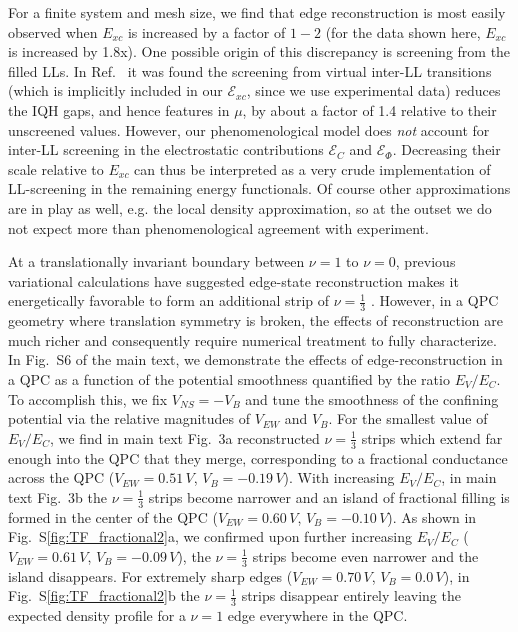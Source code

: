 \documentclass[reprint,prl,aps,superscriptaddress]{revtex4-1}
\begin{document}
For a finite system and mesh size, we find that edge reconstruction is most easily observed when $E_{xc}$  is increased by a factor of $1 - 2$  (for the data shown here, $E_{xc}$ is increased by 1.8x).  One possible origin of this discrepancy is screening from the filled LLs. 
In Ref.~\cite{yang_experimental_2021} it was found the screening from virtual inter-LL  transitions (which is implicitly included in our $\mathcal{E}_{xc}$, since we use experimental data) reduces the IQH gaps, and hence features in $\mu$, by about a factor of 1.4 relative to their unscreened values.  However, our phenomenological model does \emph{not} account for inter-LL screening in the electrostatic contributions $\mathcal{E}_C$ and $\mathcal{E}_\Phi$. 
Decreasing their scale relative to $E_{xc}$ can thus be interpreted as a very crude implementation of LL-screening in the remaining energy functionals. Of course other approximations are in play as well,  e.g. the local density approximation, so at the outset we do not expect more than phenomenological agreement with experiment. 

At a translationally invariant boundary between $\nu=1$ to $\nu=0$, previous variational calculations have suggested edge-state reconstruction makes it energetically favorable to form an additional strip of $\nu=\tfrac13$ \cite{khanna_fractional_2021}.  However, in a QPC geometry where translation symmetry is broken, the effects of reconstruction are much richer and consequently require numerical treatment to fully characterize.  In Fig.~S6 of the main text, we demonstrate the effects of edge-reconstruction in a QPC as a function of the potential smoothness quantified by the ratio $E_V / E_C$.  To accomplish this, we fix $V_{NS} = -V_B$ and tune the smoothness of the confining potential via the relative magnitudes of $V_{EW}$ and $V_B$. 
For the smallest value of $E_V / E_C$, we find in main text Fig.~3a reconstructed $\nu=\frac13$ strips which extend far enough into the QPC that they merge, corresponding to a fractional conductance across the QPC ($V_{EW}=0.51\,\si{V}$, $V_B=-0.19\,\si{V}$). With increasing $E_V / E_C$, in main text Fig.~3b the $\nu=\tfrac13$ strips become narrower and an island of fractional filling is formed in the center of the QPC ($V_{EW}=0.60\,\si{V}$, $V_B=-0.10\,\si{V}$).  As shown in Fig.~S\ref{fig:TF_fractional2}a, we confirmed upon further increasing $E_V / E_C$ ($V_{EW} = 0.61\,\si{V}$, $V_B=-0.09\,\si{V}$), the $\nu=\tfrac13$ strips become even narrower and the island disappears. For extremely sharp edges ($V_{EW}=0.70\,\si{V}$, $V_B=0.0\,\si{V}$), in Fig.~S\ref{fig:TF_fractional2}b the $\nu=\tfrac13$ strips disappear entirely leaving the expected density profile for a $\nu = 1$ edge everywhere in the QPC.
\end{document}
